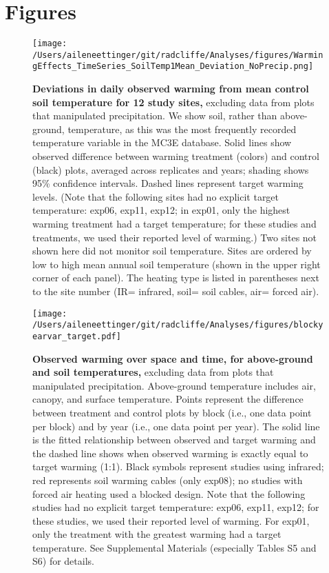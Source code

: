 \documentclass{article}
\begin{document}
\section* {Figures}
\clearpage
 \begin{figure}[h]
\centering
 \texttt{[image: /Users/aileneettinger/git/radcliffe/Analyses/figures/WarmingEffects\_TimeSeries\_SoilTemp1Mean\_Deviation\_NoPrecip.png]}
 \caption{\textbf{Deviations in daily observed warming from mean control soil temperature for 12 study sites,} excluding data from plots that manipulated precipitation. We show soil, rather than above-ground, temperature, as this was the most frequently recorded temperature variable in the MC3E database. Solid lines show observed difference between warming treatment (colors) and control (black) plots, averaged across replicates and years; shading shows 95\% confidence intervals. Dashed lines represent target warming levels. (Note that the following sites had no explicit target temperature: exp06, exp11, exp12; in exp01, only the highest warming treatment had a target temperature; for these studies and treatments, we used their reported level of warming.) Two sites not shown here did not monitor soil temperature. Sites are ordered by low to high mean annual soil temperature (shown in the upper right corner of each panel). The heating type is listed in parentheses next to the site number (IR= infrared, soil= soil cables, air= forced air).} %
 \label{fig:effwarm}
 \end{figure}
 \begin{figure}[p]
 \centering
 \texttt{[image: /Users/aileneettinger/git/radcliffe/Analyses/figures/blockyearvar\_target.pdf]} 
 \caption{\textbf{Observed warming over space and time, for above-ground and soil temperatures,} excluding data from plots that manipulated precipitation. Above-ground temperature includes air, canopy, and surface temperature. Points represent the difference between treatment and control plots by block (i.e., one data point per block) and by year (i.e., one data point per year). The solid line is the fitted relationship between observed and target warming and the dashed line shows when observed warming is exactly equal to target warming (1:1). Black symbols represent studies using infrared; red represents soil warming cables (only exp08); no studies with forced air heating used a blocked design. Note that the following studies had no explicit target temperature: exp06, exp11, exp12; for these studies, we used their reported level of warming. For exp01, only the treatment with the greatest warming had a target temperature. See Supplemental Materials (especially Tables S5 and S6) for details.}
 \label{fig:blockyear}
 \end{figure}
\end{document}
